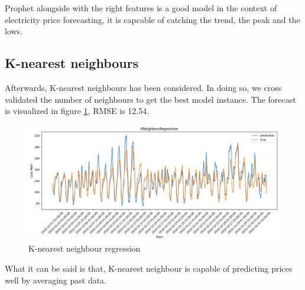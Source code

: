 
Prophet alongside with the right features is a good model in the context of electricity price forecasting, it is capcable of catching the trend, the peak and the lows. 

\subsection{K-nearest neighbours}
Afterwards, K-nearest neighbours has been considered. In doing so, we cross validated the number of neighbours to get the best model instance. The forecast is visualized in figure \ref{fig:knn_price}, RMSE is 12.54.
\begin{figure}[!h]
    \includegraphics[width=\textwidth]{images/knn_price.png}
    \caption{K-nearest neighbour regression}
    \label{fig:knn_price}
\end{figure}
What it can be said is that, K-nearest neighbour is capable of predicting prices well by averaging past data.

